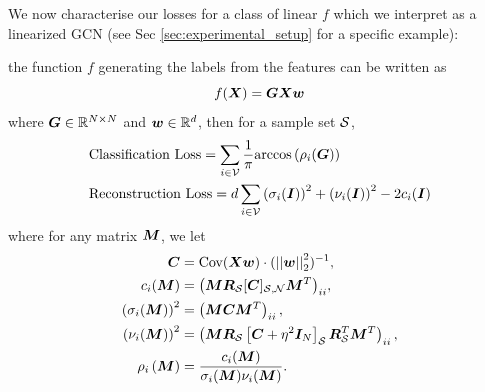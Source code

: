 We now characterise our losses for a class of linear $f$ which we interpret as a linearized GCN (see Sec \ref{sec:experimental_setup} for a specific example):
    
\begin{theorem}
\label{thm:general_class_err}
     the function $f$ generating the labels from the features can be written as $$f(\bm{X}) = \bm{G}\bm{X}\bm{w}$$ where $\bm{G}\in \mathbb{R}^{N \times N}$ and $\bm{w} \in \mathbb{R}^{d}$, then for a sample set $\mathcal{S}$,
    \begin{align}
         &\text{Classification Loss}  = \sum_{i \in \mathcal{V}} \frac{1}{\pi}\text{arccos}\left( \rho_{i}(\bm{G}) \right) \label{eq:gen_class_err}
        \\  &\text{Reconstruction Loss}  =  d \sum_{i \in \mathcal{V}} \left(\sigma_{i}(\bm{I})\right)^{2} + \left(\nu_{i}(\bm{I})\right)^{2} - 2c_{i}(\bm{I}) \label{eq:gen_rec_err}
    \end{align}
    where for any matrix $\bm{M}$, we let
    \begin{align}
        \matr{C} &= \text{Cov}(\matr{X}\vect{w}) \cdot (\sqnormvec{\vect{w}})^{-1},\\
        c_{i}(\matr{M}) &={\left(\matr{M}\matr{R}_{\set{S}}\matrsub[S,N]{C} \matr{M}^{T}\right)_{ii}}, \\
        \left(\sigma_{i}(\matr{M})\right)^{2} &= \left(\matr{M}\matr{C}\matr{M}^{T}\right)_{ii}, \\
        \left(\nu_{i}(\matr{M})\right)^{2} &= \left( \matr{M}\matr{R}_{\set{S}}\msubgen[\set{S}]{\matr{C} + \eta^{2}\matr{I}_{N}} \matr{R}_{\set{S}}^{T} \matr{M}^{T}\right)_{ii},\\
        \rho_{i}\left(\matr{M}\right) &= \frac{c_{i}(\matr{M})}{\sigma_{i}(\matr{M})\nu_{i}(\matr{M})}.
    \end{align}
\end{theorem}
